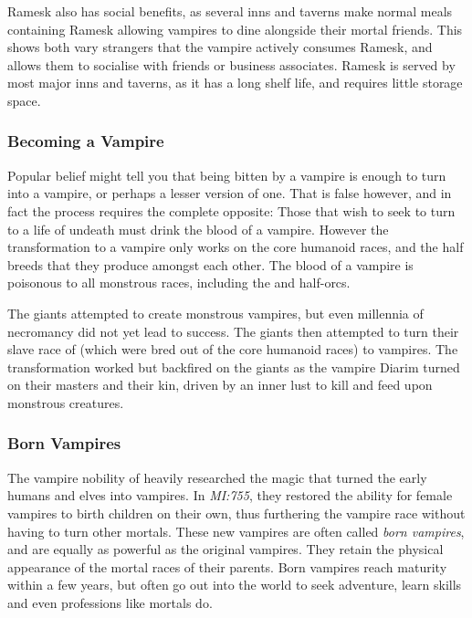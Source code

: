 Ramesk also has social benefits, as several inns and taverns make normal meals
containing Ramesk allowing vampires to dine alongside their mortal friends.
This shows both vary strangers that the vampire actively consumes Ramesk, and
allows them to socialise with friends or business associates. Ramesk is served
by most major inns and taverns, as it has a long shelf life, and requires
little storage space.

\subsubsection{Becoming a Vampire}

Popular belief might tell you that being bitten by a vampire is enough to turn
into a vampire, or perhaps a lesser version of one. That is false however, and
in fact the process requires the complete opposite: Those that wish to seek to
turn to a life of undeath must drink the blood of a vampire. However the
transformation to a vampire only works on the core humanoid races, and the half
breeds that they produce amongst each other. The blood of a vampire is poisonous
to all monstrous races, including the  and half-orcs.

The giants attempted to create monstrous vampires, but even millennia of
necromancy did not yet lead to success. The giants then attempted to turn
their slave race of  (which were bred out of the core
humanoid races) to vampires. The transformation worked but backfired on the
giants as the vampire Diarim turned on their masters and their kin, driven by
an inner lust to kill and feed upon monstrous creatures.

\subsubsection{Born Vampires}
\label{sec:Born Vampires}

The vampire nobility of  heavily researched the magic
that turned the early humans and elves into vampires. In \emph{MI:755}, they
restored the ability for female vampires to birth children on their own, thus
furthering the vampire race without having to turn other mortals. These new
vampires are often called \emph{born vampires}, and are equally as powerful
as the original vampires. They retain the physical appearance of the mortal
races of their parents. Born vampires reach maturity within a few years, but
often go out into the world to seek adventure, learn skills and even
professions like mortals do.


